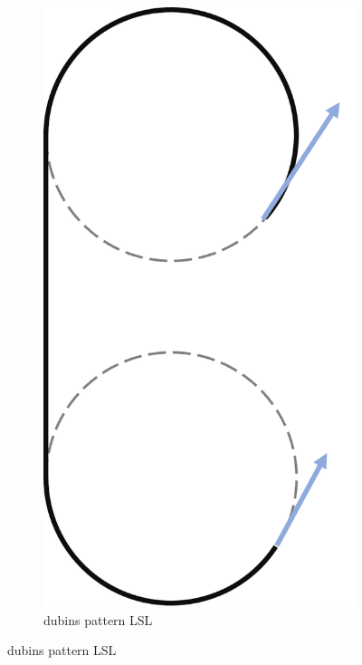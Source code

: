\begin{figure}
     \centering
     \begin{subfigure}[b]{0.2\textwidth}
         \centering
         \includegraphics[scale=0.7]{fig/dubins/LSL.png}
         \caption{dubins pattern LSL}
         \label{fig: dubins pattern LSL}
     \end{subfigure}

\end{figure}

